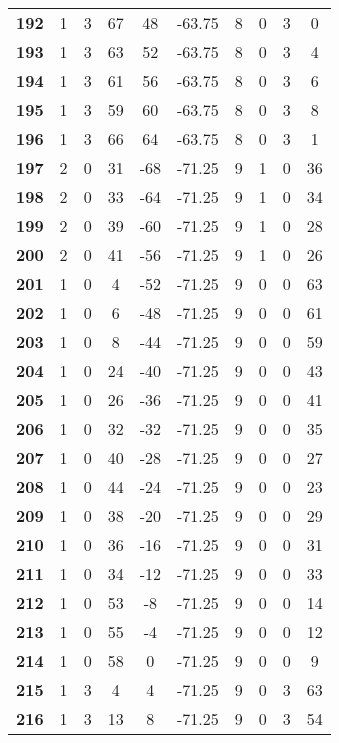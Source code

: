 \documentclass[12pt,letterpaper, onecolumn]{exam}
\begin{document}
\begin{longtable}{cccccccccc}
    \textbf{192} & 1 & 3 & 67 & 48 & -63.75 & 8 & 0 & 3 & 0 \\ 
    \textbf{193} & 1 & 3 & 63 & 52 & -63.75 & 8 & 0 & 3 & 4 \\ 
    \textbf{194} & 1 & 3 & 61 & 56 & -63.75 & 8 & 0 & 3 & 6 \\ 
    \textbf{195} & 1 & 3 & 59 & 60 & -63.75 & 8 & 0 & 3 & 8 \\ 
    \textbf{196} & 1 & 3 & 66 & 64 & -63.75 & 8 & 0 & 3 & 1 \\     \hline
    \textbf{197} & 2 & 0 & 31 & -68 & -71.25 & 9 & 1 & 0 & 36 \\ 
    \textbf{198} & 2 & 0 & 33 & -64 & -71.25 & 9 & 1 & 0 & 34 \\ 
    \textbf{199} & 2 & 0 & 39 & -60 & -71.25 & 9 & 1 & 0 & 28 \\ 
    \textbf{200} & 2 & 0 & 41 & -56 & -71.25 & 9 & 1 & 0 & 26 \\ 
    \textbf{201} & 1 & 0 & 4 & -52 & -71.25 & 9 & 0 & 0 & 63 \\ 
    \textbf{202} & 1 & 0 & 6 & -48 & -71.25 & 9 & 0 & 0 & 61 \\ 
    \textbf{203} & 1 & 0 & 8 & -44 & -71.25 & 9 & 0 & 0 & 59 \\ 
    \textbf{204} & 1 & 0 & 24 & -40 & -71.25 & 9 & 0 & 0 & 43 \\ 
    \textbf{205} & 1 & 0 & 26 & -36 & -71.25 & 9 & 0 & 0 & 41 \\ 
    \textbf{206} & 1 & 0 & 32 & -32 & -71.25 & 9 & 0 & 0 & 35 \\ 
    \textbf{207} & 1 & 0 & 40 & -28 & -71.25 & 9 & 0 & 0 & 27 \\ 
    \textbf{208} & 1 & 0 & 44 & -24 & -71.25 & 9 & 0 & 0 & 23 \\ 
    \textbf{209} & 1 & 0 & 38 & -20 & -71.25 & 9 & 0 & 0 & 29 \\ 
    \textbf{210} & 1 & 0 & 36 & -16 & -71.25 & 9 & 0 & 0 & 31 \\ 
    \textbf{211} & 1 & 0 & 34 & -12 & -71.25 & 9 & 0 & 0 & 33 \\ 
    \textbf{212} & 1 & 0 & 53 & -8 & -71.25 & 9 & 0 & 0 & 14 \\ 
    \textbf{213} & 1 & 0 & 55 & -4 & -71.25 & 9 & 0 & 0 & 12 \\ 
    \textbf{214} & 1 & 0 & 58 & 0 & -71.25 & 9 & 0 & 0 & 9 \\ 
    \textbf{215} & 1 & 3 & 4 & 4 & -71.25 & 9 & 0 & 3 & 63 \\ 
    \textbf{216} & 1 & 3 & 13 & 8 & -71.25 & 9 & 0 & 3 & 54 \\ 

\end{longtable}
\end{document}
